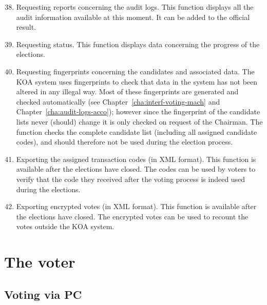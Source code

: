 \begin{enumerate}
\setcounter{enumi}{37}
	\item Requesting reports concerning the audit logs. This
	function displays all the audit information available at this
	moment. It can be added to the official result.

	\item Requesting status. This function displays data
	concerning the progress of the elections.

	\item Requesting fingerprints concerning the candidates and
	associated data. The KOA system uses fingerprints to check
	that data in the system has not been altered in any illegal
	way. Most of these fingerprints are generated and checked
	automatically (see Chapter~\ref{cha:interf-voting-mach} and
	Chapter~\ref{cha:audit-logs-acco}); however since the fingerprint
	of the candidate lists never (should) change it is only
	checked on request of the Chairman. The function checks the
	complete candidate list (including all assigned candidate
	codes), and should therefore not be used during the election
	process.

	\item Exporting the assigned transaction codes (in XML
	format). This function is available after the elections have
	closed. The codes can be used by voters to verify that the
	code they received after the voting process is indeed used
	during the elections.

	\item Exporting encrypted votes (in XML format). This function
	is available after the elections have closed. The encrypted
	votes can be used to recount the votes outside the KOA system.

\end{enumerate}

\section{The voter}\label{sec3:voter}

\subsection{Voting via PC}\label{sec3:voting-via-pc}

